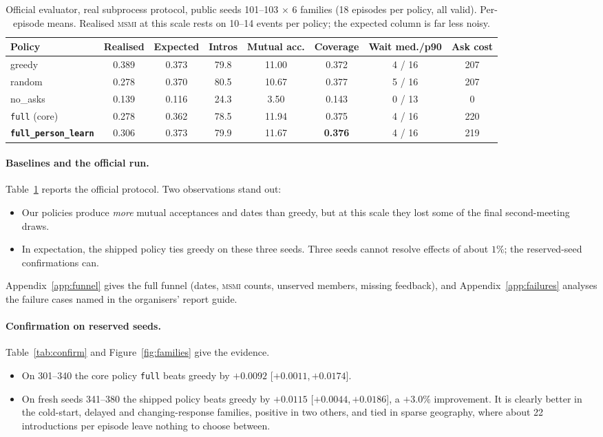 \documentclass[10pt]{article}
\newcommand{\msmi}{\textsc{msmi}}
\newcommand{\full}{\texttt{full}}
\newcommand{\ship}{\texttt{full\_person\_learn}}
\newcommand{\ci}[2]{[$#1$,\,$#2$]}
\begin{document}
\begin{table}[t]
\centering\small
\caption{Official evaluator, real subprocess protocol, public seeds 101--103 $\times$ 6 families (18 episodes per policy, all valid). Per-episode means. Realised \msmi{} at this scale rests on 10--14 events per policy; the expected column is far less noisy.}
\label{tab:official}
\setlength{\tabcolsep}{4pt}
\begin{tabular}{lccccccc}
\toprule
Policy & Realised & Expected & Intros & Mutual acc. & Coverage & Wait med./p90 & Ask cost \\
\midrule
greedy & 0.389 & 0.373 & 79.8 & 11.00 & 0.372 & 4 / 16 & 207 \\
random & 0.278 & 0.370 & 80.5 & 10.67 & 0.377 & 5 / 16 & 207 \\
no\_asks & 0.139 & 0.116 & 24.3 & 3.50 & 0.143 & 0 / 13 & 0 \\
\full{} (core) & 0.278 & 0.362 & 78.5 & 11.94 & 0.375 & 4 / 16 & 220 \\
\textbf{\ship{}} & 0.306 & 0.373 & 79.9 & 11.67 & \textbf{0.376} & 4 / 16 & 219 \\
\bottomrule
\end{tabular}
\end{table}

\paragraph{Baselines and the official run.} Table~\ref{tab:official} reports the official protocol. Two observations stand out:
\begin{itemize}
\item Our policies produce \emph{more} mutual acceptances and dates than greedy, but at this scale they lost some of the final second-meeting draws.
\item In expectation, the shipped policy ties greedy on these three seeds. Three seeds cannot resolve effects of about $1\%$; the reserved-seed confirmations can.
\end{itemize}
Appendix~\ref{app:funnel} gives the full funnel (dates, \msmi{} counts, unserved members, missing feedback), and Appendix~\ref{app:failures} analyses the failure cases named in the organisers' report guide.

\paragraph{Confirmation on reserved seeds.} Table~\ref{tab:confirm} and Figure~\ref{fig:families} give the evidence.
\begin{itemize}
\item On 301--340 the core policy \full{} beats greedy by $+0.0092$ \ci{+0.0011}{+0.0174}.
\item On fresh seeds 341--380 the shipped policy beats greedy by $+0.0115$ \ci{+0.0044}{+0.0186}, a $+3.0\%$ improvement. It is clearly better in the cold-start, delayed and changing-response families, positive in two others, and tied in sparse geography, where about 22 introductions per episode leave nothing to choose between.
\end{itemize}
\end{document}
